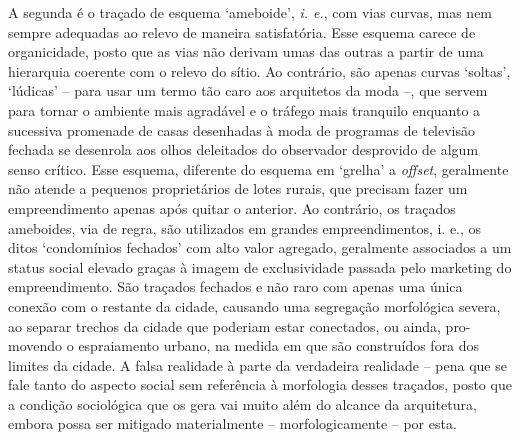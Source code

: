 \documentclass[twoside, 12pt]{book}
\begin{document}
        A segunda é o traçado de esquema ‘ameboide’, \textit{i. e.}, com vias curvas, mas nem sempre adequadas ao relevo de maneira satisfatória. Esse esquema carece de organicidade, posto que as vias não derivam umas das outras a partir de uma hierarquia coerente com o relevo do sítio. Ao contrário, são apenas curvas ‘soltas’, ‘lúdicas’ – para usar um termo tão caro aos arquitetos da moda –, que servem para tornar o ambiente mais agradável e o tráfego mais tranquilo enquanto a sucessiva promenade de casas desenhadas à moda de programas de televisão fechada se desenrola aos olhos deleitados do observador desprovido de algum senso crítico. Esse esquema, diferente do esquema em ‘grelha’ a \textit{offset}, geralmente não atende a pequenos proprietários de lotes rurais, que precisam fazer um empreendimento apenas após quitar o anterior. Ao contrário, os traçados ameboides, via de regra, são utilizados em grandes empreendimentos, i. e., os ditos ‘condomínios fechados’ com alto valor agregado, geralmente associados a um status social elevado graças à imagem de exclusividade passada pelo marketing do empreendimento. São traçados fechados e não raro com apenas uma única conexão com o restante da cidade, causando uma segregação morfológica severa, ao separar trechos da cidade que poderiam estar conectados, ou ainda, pro-movendo o espraiamento urbano, na medida em que são construídos fora dos limites da cidade. A falsa realidade à parte da verdadeira realidade – pena que se fale tanto do aspecto social sem referência à morfologia desses traçados, posto que a condição sociológica que os gera vai muito além do alcance da arquitetura, embora possa ser mitigado materialmente – morfologicamente – por esta.
\end{document}
